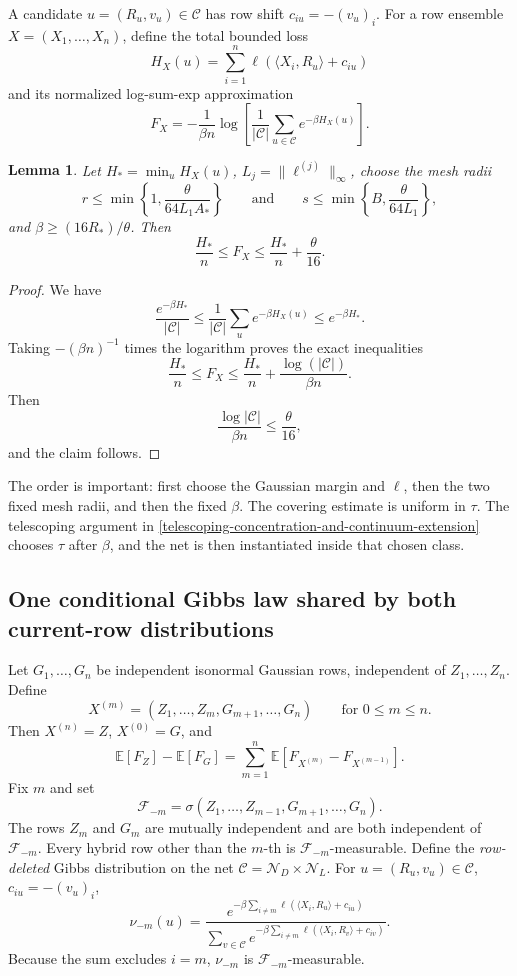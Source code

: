 \documentclass[11pt]{article}
\numberwithin{equation}{section}
\newtheorem{lemma}[theorem]{Lemma}
\theoremstyle{definition}
\theoremstyle{remark}
\newcommand{\E}{\mathbb E}
\newcommand{\1}{\boldsymbol 1}
\begin{document}
\begin{aiblock}
A candidate $u = (R_u, v_u) \in \mathcal C$ has row shift $c_{iu} = -(v_u)_i$.
For a row ensemble $X=(X_1,\ldots,X_n)$, define the total bounded loss
\[
    H_X(u) = \sum_{i = 1}^n \ell(\langle X_i, R_u \rangle + c_{iu})
\]
and its normalized log-sum-exp approximation
\[
    F_X = -\frac{1}{\beta n} \log\left[\frac{1}{|\mathcal C|} \sum_{u \in \mathcal C} e^{-\beta H_X(u)} \right].
\]
\begin{lemma} \label{lem:infeasibility_above:net_approximation}
    Let $H_* = \min_u H_X(u)$, $L_j = \|\ell^{(j)}\|_\infty$, choose the mesh radii
    \[
        r \le \min\left\{1, \frac{\theta}{64 L_1 A_*}\right\}
        \qquad \text{and} \qquad
        s \le \min\left\{B, \frac{\theta}{64 L_1}\right\},
    \]
    and $\beta \ge (16 R_*) / \theta$.
    Then
    \[
        \frac{H_*}{n} \le F_X \le \frac{H_*}{n} + \frac{\theta}{16}.
    \]
\end{lemma}

\begin{proof}
    We have
    \[
        \frac{e^{-\beta H_*}}{|\mathcal C|} \le \frac{1}{|\mathcal C|} \sum_u e^{-\beta H_X(u)} \le e^{-\beta H_*}.
    \]
    Taking $-(\beta n)^{-1}$ times the logarithm proves the exact inequalities
    \[
        \frac{H_*}{n} \le F_X \le \frac{H_*}{n} + \frac{\log(|\mathcal C|)}{\beta n}.
    \]
    Then
    \[
        \frac{\log|\mathcal C|}{\beta n} \le \frac{\theta}{16},
    \]
    and the claim follows.
\end{proof}

The order is important: first choose the Gaussian margin and $\ell$, then the two fixed mesh radii, and then the fixed $\beta$. The covering estimate is uniform in $\tau$. The telescoping argument in \cref{telescoping-concentration-and-continuum-extension} chooses $\tau$ after $\beta$, and the net is then instantiated inside that chosen class.

\subsection{One conditional Gibbs law shared by both current-row distributions} \label{a-common-leave-one-row-cavity-law}

Let $G_1, \ldots, G_n$ be independent isonormal Gaussian rows, independent of $Z_1, \ldots, Z_n$. Define
\[
    X^{(m)} = (Z_1, \ldots, Z_m, G_{m + 1}, \ldots, G_n) \qquad \text{for $0 \le m \le n$}.
\]
Then $X^{(n)}=Z$, $X^{(0)}=G$, and
\[
    \E[F_Z] - \E[F_G] = \sum_{m = 1}^n \E[F_{X^{(m)}} - F_{X^{(m - 1)}}].
\]
Fix $m$ and set
\[
    \mathcal F_{-m} = \sigma(Z_1, \ldots, Z_{m - 1}, G_{m + 1}, \ldots, G_n).
\]
The rows $Z_m$ and $G_m$ are mutually independent and are both independent of $\mathcal F_{-m}$. Every hybrid row other than the $m$-th is $\mathcal F_{-m}$-measurable.
Define the \emph{row-deleted} Gibbs distribution on the net $\mathcal C = \mathcal N_D\times\mathcal N_L$.
For $u = (R_u, v_u) \in \mathcal C$, $c_{iu} = -(v_u)_i$,
\[
    \nu_{-m}(u) = \frac{e^{-\beta \sum_{i \ne m} \ell(\langle X_i, R_u \rangle + c_{iu})}}{\sum_{v \in \mathcal C} e^{-\beta \sum_{i \ne m} \ell(\langle X_i, R_v \rangle + c_{iv})}}.
\]
Because the sum excludes $i=m$, $\nu_{-m}$ is $\mathcal F_{-m}$-measurable.


\end{aiblock}
\end{document}
